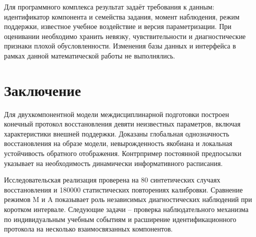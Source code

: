\documentclass[blind]{psta}
\begin{document}
Для программного комплекса результат задаёт требования к данным: идентификатор компонента и семейства задания, момент наблюдения, режим поддержки, известное учебное воздействие и версия параметризации. При оценивании необходимо хранить невязку, чувствительности и диагностические признаки плохой обусловленности. Изменения базы данных и интерфейса в рамках данной математической работы не выполнялись.

\FloatBarrier
\section*{Заключение}
Для двухкомпонентной модели междисциплинарной подготовки построен конечный протокол восстановления девяти неизвестных параметров, включая характеристики внешней поддержки. Доказаны глобальная однозначность восстановления на образе модели, невырожденность якобиана и локальная устойчивость обратного отображения. Контрпример постоянной предпосылки указывает на необходимость динамически информативного расписания.

Исследовательская реализация проверена на 80 синтетических случаях восстановления и 180000 статистических повторениях калибровки. Сравнение режимов M и A показывает роль независимых диагностических наблюдений при коротком интервале. Следующие задачи – проверка наблюдательного механизма по индивидуальным учебным событиям и расширение идентификационного протокола на несколько взаимосвязанных компонентов.
\end{document}
